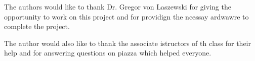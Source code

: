 \documentclass[sigconf]{acmart}
\begin{document}
\begin{acks}

  The authors would like to thank Dr. Gregor von Laszewski for giving the opportunity to work on this project and for providign the ncessay ardwawre to complete the project.
  
  The author would also like to thank the associate istructors of th class for their help and for answering questions on piazza which helped everyone.

\end{acks}


 

\appendix




\end{document}
